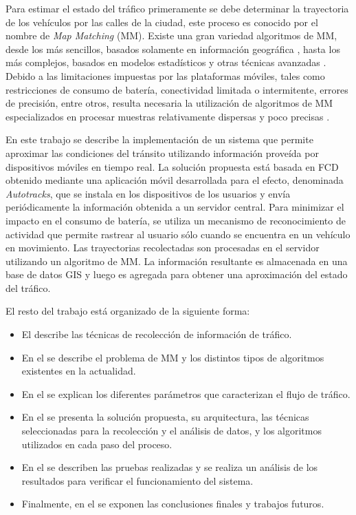 Para estimar el estado del tráfico primeramente se debe determinar la trayectoria de los vehículos por las calles de la ciudad, este proceso es conocido por el nombre de \emph{Map Matching} (MM). Existe una gran variedad algoritmos de MM, desde los más sencillos, basados solamente en información geográfica \cite{white2000some}, hasta los más complejos, basados en modelos estadísticos y otras técnicas avanzadas \cite{quddus2006high,kim2001adaptive}. Debido a las limitaciones impuestas por las plataformas móviles, tales como restricciones de consumo de batería, conectividad limitada o intermitente, errores de precisión, entre otros, resulta necesaria la utilización de algoritmos de MM especializados en procesar muestras relativamente dispersas y poco precisas \cite{lou2009map}.

En este trabajo se describe la implementación de un sistema que permite aproximar las condiciones del tránsito utilizando información proveída por dispositivos móviles en tiempo real. La solución propuesta está basada en FCD obtenido mediante una aplicación móvil desarrollada para el efecto, denominada \emph{Autotracks}, que se instala en los dispositivos de los usuarios y envía periódicamente la información obtenida a un servidor central. Para minimizar el impacto en el consumo de batería, se utiliza un mecanismo de reconocimiento de actividad que permite rastrear al usuario sólo cuando se encuentra en un vehículo en movimiento. Las trayectorias recolectadas son procesadas en el servidor utilizando un algoritmo de MM. La información resultante es almacenada en una base de datos GIS y luego es agregada para obtener una aproximación del estado del tráfico.

El resto del trabajo está organizado de la siguiente forma:
\begin{itemize}
\item El  describe las técnicas de recolección de información de tráfico. 
\item En el  se describe el problema de MM y los distintos tipos de algoritmos existentes en la actualidad. 
\item En el  se explican los diferentes parámetros que caracterizan el flujo de tráfico. 
\item En el  se presenta la solución propuesta, su arquitectura, las técnicas seleccionadas para la recolección y el análisis de datos, y los algoritmos utilizados en cada paso del proceso. 
\item En el  se describen las pruebas realizadas y se realiza un análisis de los resultados para verificar el funcionamiento del sistema. 
\item Finalmente, en el  se exponen las conclusiones finales y trabajos futuros.
\end{itemize}
